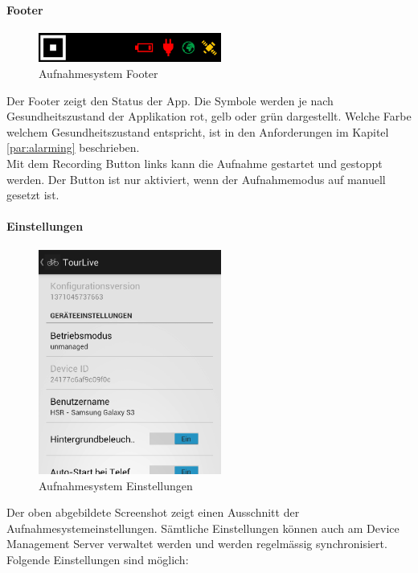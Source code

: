 \paragraph{Footer}
\begin{figure}[H]
	\centering
	\includegraphics[width=60mm]{images/android/footer.png}
	\caption{Aufnahmesystem Footer}
\end{figure}
Der Footer zeigt den Status der App. Die Symbole werden je nach Gesundheitszustand der Applikation rot, gelb oder grün dargestellt. Welche Farbe welchem Gesundheitszustand entspricht, ist in den Anforderungen im Kapitel \ref{par:alarming} beschrieben.\\

Mit dem Recording Button links kann die Aufnahme gestartet und gestoppt werden. Der Button ist nur aktiviert, wenn der Aufnahmemodus auf manuell gesetzt ist.

\paragraph{Einstellungen}
\begin{figure}[H]
	\centering
	\includegraphics[width=60mm]{images/android/settings.png}
	\caption{Aufnahmesystem Einstellungen}
\end{figure}

Der oben abgebildete Screenshot zeigt einen Ausschnitt der Aufnahmesystemeinstellungen. Sämtliche Einstellungen können auch am Device Management Server verwaltet werden und werden regelmässig synchronisiert. Folgende Einstellungen sind möglich:

